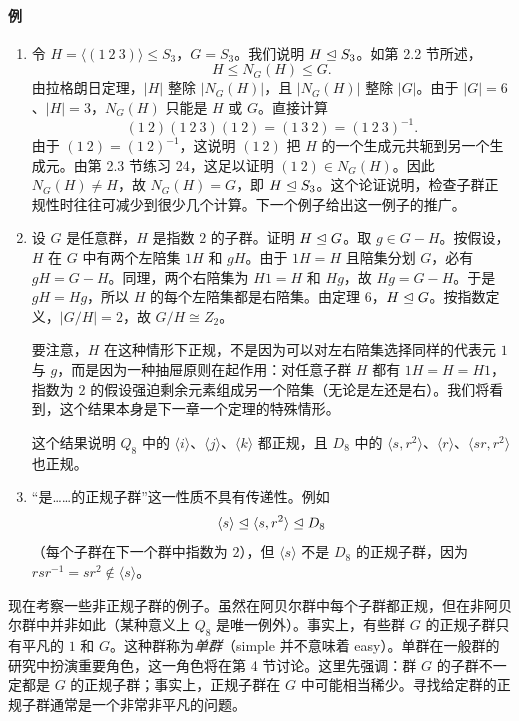 \paragraph{例}
\begin{enumerate}[label=(\arabic*)]
  \item 令 $H=\langle(1\ 2\ 3)\rangle\leq S_3$，$G=S_3$。我们说明 $H\trianglelefteq S_3$。如第 2.2 节所述，
  \[
    H\leq N_G(H)\leq G.
  \]
  由拉格朗日定理，$|H|$ 整除 $|N_G(H)|$，且 $|N_G(H)|$ 整除 $|G|$。由于 $|G|=6$、$|H|=3$，$N_G(H)$ 只能是 $H$ 或 $G$。直接计算
  \[
    (1\ 2)(1\ 2\ 3)(1\ 2)=(1\ 3\ 2)=(1\ 2\ 3)^{-1}.
  \]
  由于 $(1\ 2)=(1\ 2)^{-1}$，这说明 $(1\ 2)$ 把 $H$ 的一个生成元共轭到另一个生成元。由第 2.3 节练习 24，这足以证明 $(1\ 2)\in N_G(H)$。因此 $N_G(H)\neq H$，故 $N_G(H)=G$，即 $H\trianglelefteq S_3$。这个论证说明，检查子群正规性时往往可减少到很少几个计算。下一个例子给出这一例子的推广。
  \item 设 $G$ 是任意群，$H$ 是指数 $2$ 的子群。证明 $H\trianglelefteq G$。取 $g\in G-H$。按假设，$H$ 在 $G$ 中有两个左陪集 $1H$ 和 $gH$。由于 $1H=H$ 且陪集分划 $G$，必有 $gH=G-H$。同理，两个右陪集为 $H1=H$ 和 $Hg$，故 $Hg=G-H$。于是 $gH=Hg$，所以 $H$ 的每个左陪集都是右陪集。由定理 6，$H\trianglelefteq G$。按指数定义，$|G/H|=2$，故 $G/H\cong Z_2$。

  要注意，$H$ 在这种情形下正规，不是因为可以对左右陪集选择同样的代表元 $1$ 与 $g$，而是因为一种抽屉原则在起作用：对任意子群 $H$ 都有 $1H=H=H1$，指数为 $2$ 的假设强迫剩余元素组成另一个陪集（无论是左还是右）。我们将看到，这个结果本身是下一章一个定理的特殊情形。

  这个结果说明 $Q_8$ 中的 $\langle i\rangle$、$\langle j\rangle$、$\langle k\rangle$ 都正规，且 $D_8$ 中的 $\langle s,r^2\rangle$、$\langle r\rangle$、$\langle sr,r^2\rangle$ 也正规。
  \item “是……的正规子群”这一性质不具有传递性。例如
  \[
    \langle s\rangle\trianglelefteq\langle s,r^2\rangle\trianglelefteq D_8
  \]
  （每个子群在下一个群中指数为 $2$），但 $\langle s\rangle$ 不是 $D_8$ 的正规子群，因为 $rsr^{-1}=sr^2\notin\langle s\rangle$。
\end{enumerate}

现在考察一些非正规子群的例子。虽然在阿贝尔群中每个子群都正规，但在非阿贝尔群中并非如此（某种意义上 $Q_8$ 是唯一例外）。事实上，有些群 $G$ 的正规子群只有平凡的 $1$ 和 $G$。这种群称为\emph{单群}（simple 并不意味着 easy）。单群在一般群的研究中扮演重要角色，这一角色将在第 4 节讨论。这里先强调：群 $G$ 的子群不一定都是 $G$ 的正规子群；事实上，正规子群在 $G$ 中可能相当稀少。寻找给定群的正规子群通常是一个非常非平凡的问题。

